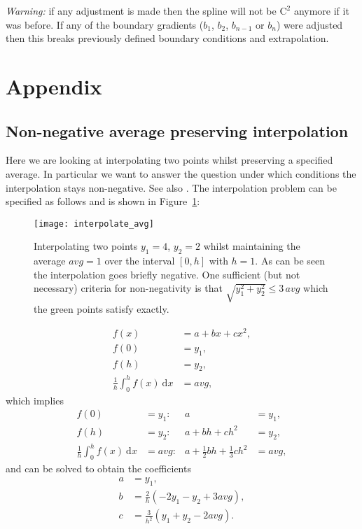 \documentclass[11pt]{article}
\newcommand{\dd}{\:\text{d}}
\newcommand{\avg}{\textit{avg}}
\newcommand{\Co}{\mathrm{C}}
\theoremstyle{break}            %
\begin{document}
\emph{Warning:} if any adjustment is made then the
spline will not be $\Co^2$ anymore if it was before. If any of the boundary
gradients ($b_1$, $b_2$, $b_{n-1}$ or $b_n$) were adjusted then this
breaks previously defined boundary conditions and extrapolation.
\clearpage
\section{Appendix}
\subsection{Non-negative average preserving interpolation}
\label{sec:non_neg_avg_preserving}
Here we are looking at interpolating two points whilst preserving
a specified average. In particular we want to answer the question
under which conditions the interpolation stays non-negative. See also
\cite{Fri:1980:monotone_spline}.
The interpolation problem can be specified as follows
and is shown in Figure~\ref{fig:interpolate_avg}:
\begin{figure}
  \centering
  \texttt{[image: interpolate\_avg]}
  \caption{Interpolating two points $y_1=4$, $y_2=2$
        whilst maintaining the average $\avg=1$ over the interval
        $[0,h]$ with $h=1$. As can be seen the interpolation goes
        briefly negative. One sufficient (but not necessary) criteria for
        non-negativity is that $\sqrt{y_1^2+y_2^2}\leq 3\, \avg$ which
        the green points satisfy exactly.}
  \label{fig:interpolate_avg}
\end{figure}
\begin{equation}
\label{eq:interpolate_avg}
\begin{split}
 f(x) & = a + b x + c x^2, \\
 f(0) & = y_1,\\
 f(h) & = y_2,\\
 \frac{1}{h}\int_0^h f(x) \dd x & = \avg,
\end{split}
\end{equation}
which implies
\begin{equation*}
\begin{aligned}
  f(0) & =y_1: &
    a & = y_1,\\
  f(h) & = y_2: &
	a + bh + ch^2 & = y_2,\\
  \frac{1}{h}\int_0^h f(x) \dd x & = \avg:  &
        a + \frac{1}{2} bh + \frac{1}{3} ch^2 & = \avg,
\end{aligned}
\end{equation*}
and can be solved to obtain the coefficients
\begin{equation}
\label{eq:avg_interp_solve_coeffs}
\begin{split}
    a & = y_1,\\
    b & = \frac{2}{h}\left(-2 y_1 -y_2 + 3\avg\right),\\
    c & = \frac{3}{h^2}\left(y_1+y_2-2\avg\right).
\end{split}
\end{equation}
\end{document}
